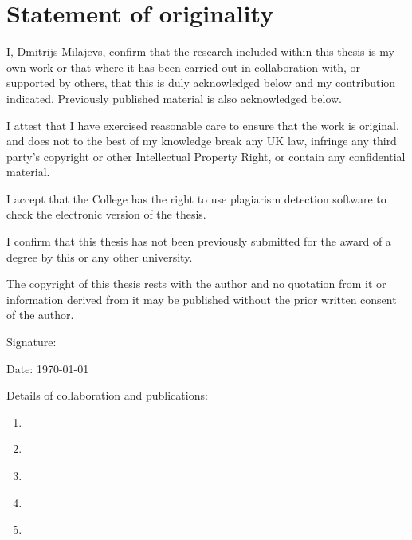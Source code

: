 \chapter*{Statement of originality}

I, Dmitrijs Milajevs, confirm that the research included within this thesis is my own work or that where it has been carried out in collaboration with, or supported by others, that this is duly acknowledged below and my contribution indicated. Previously published material is also acknowledged below.

I attest that I have exercised reasonable care to ensure that the work is original, and does not to the best of my knowledge break any UK law, infringe any third party’s copyright or other Intellectual Property Right, or contain any confidential material.

I accept that the College has the right to use plagiarism detection software to check the electronic version of the thesis.

I confirm that this thesis has not been previously submitted for the award of a degree by this or any other university.

The copyright of this thesis rests with the author and no quotation from it or information derived from it may be published without the prior written consent of the author.

Signature:

Date: \today

Details of collaboration and publications:
\begin{enumerate}
\item \citet*{milajevs-purver:2014:CVSC}
\item \citet*{milajevs-EtAl:2014:EMNLP2014}
\item \citet*{Milajevs:2015:IMN:2808194.2809448}
\item \citet*{milajevs:2016:SRW1}
\item \citet*{milajevs-griffiths:2016:repeval}
\end{enumerate}

